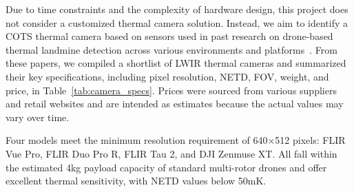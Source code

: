 Due to time constraints and the complexity of hardware design, this project does not consider a customized thermal camera solution. Instead, we aim to identify a \gls{COTS} thermal camera based on sensors used in past research on drone-based thermal landmine detection across various environments and platforms~\cite{baur2020applying,nikulin2018detection,krause2018diurnal,TENORIOTAMAYO2024105567,FORERORAMIREZ2022104307,rs15040967,dena2020image,Fardoulis2020PROOFHS,butt2024uav,AgrawalChung2024ComparingSL,Popov2022MethodFM,TENORIOTAMAYO2023109443}. From these papers, we compiled a shortlist of \gls{LWIR} thermal cameras and summarized their key specifications, including pixel resolution, \gls{NETD}, \gls{FOV}, weight, and price, in Table~\ref{tab:camera_specs}. Prices were sourced from various suppliers and retail websites and are intended as estimates because the actual values may vary over time.

Four models meet the minimum resolution requirement of 640×512 pixels: FLIR Vue Pro, FLIR Duo Pro R, FLIR Tau 2, and DJI Zenmuse XT. All fall within the estimated 4kg payload capacity of standard multi-rotor drones and offer excellent thermal sensitivity, with \gls{NETD} values below 50mK.


\renewcommand{\arraystretch}{0.9}
\setlength{\tabcolsep}{5pt}

